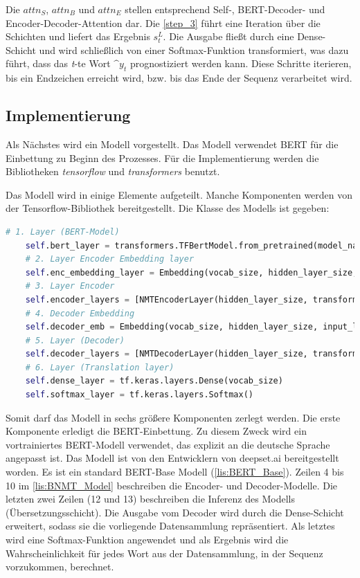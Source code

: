Die $attn_S$, $attn_B$ und $attn_E$ stellen entsprechend Self-, BERT-Decoder- und Encoder-Decoder-Attention dar. Die \cref{step_3} führt eine Iteration über die Schichten und liefert das Ergebnis $s^L_t$. Die Ausgabe fließt durch eine Dense-Schicht und wird schließlich von einer Softmax-Funktion transformiert, was dazu führt, dass das \textit{t}-te Wort $\^y_t$ prognostiziert werden kann. Diese Schritte iterieren, bis ein Endzeichen erreicht wird, bzw. bis das Ende der Sequenz verarbeitet wird.

\subsection{Implementierung}

Als Nächstes wird ein Modell vorgestellt. Das Modell verwendet BERT für die Einbettung zu Beginn des Prozesses. Für die Implementierung werden die Bibliotheken \textit{tensorflow} und \textit{transformers} benutzt.

Das Modell wird in einige Elemente aufgeteilt. Manche Komponenten werden von der Tensorflow-Bibliothek bereitgestellt. Die Klasse des Modells ist gegeben:

\begin{lstlisting}[language=Python, caption={BNMT\_Model}, label={lis:BNMT_Model}]
	# 1. Layer (BERT-Model)
	self.bert_layer = transformers.TFBertModel.from_pretrained(model_name)
	# 2. Layer Encoder Embedding layer
	self.enc_embedding_layer = Embedding(vocab_size, hidden_layer_size, input_length=seq_len)
	# 3. Layer Encoder
	self.encoder_layers = [NMTEncoderLayer(hidden_layer_size, transformer_heads, 1e-3) for _ in range(transformer_heads)]
	# 4. Decoder Embedding
	self.decoder_emb = Embedding(vocab_size, hidden_layer_size, input_length=seq_len)
	# 5. Layer (Decoder)
	self.decoder_layers = [NMTDecoderLayer(hidden_layer_size, transformer_heads, 1e-3) for _ in range(transformer_heads)]
	# 6. Layer (Translation layer) 
	self.dense_layer = tf.keras.layers.Dense(vocab_size)
	self.softmax_layer = tf.keras.layers.Softmax()
\end{lstlisting}

Somit darf das Modell in sechs größere Komponenten zerlegt werden. Die erste Komponente erledigt die BERT-Einbettung. Zu diesem Zweck wird ein vortrainiertes BERT-Modell verwendet, das explizit an die deutsche Sprache angepasst ist. Das Modell ist von den Entwicklern von deepset.ai \cite{bert_based:19} bereitgestellt worden. Es ist ein standard BERT-Base Modell (\cref{lis:BERT_Base}). Zeilen 4 bis 10 im \cref{lis:BNMT_Model} beschreiben die Encoder- und Decoder-Modelle. Die letzten zwei Zeilen (12 und 13) beschreiben die Inferenz des Modells (Übersetzungsschicht). Die Ausgabe vom Decoder wird durch die Dense-Schicht erweitert, sodass sie die vorliegende Datensammlung repräsentiert. Als letztes wird eine Softmax-Funktion angewendet und als Ergebnis wird die Wahrscheinlichkeit für jedes Wort aus der Datensammlung, in der Sequenz vorzukommen, berechnet. 

